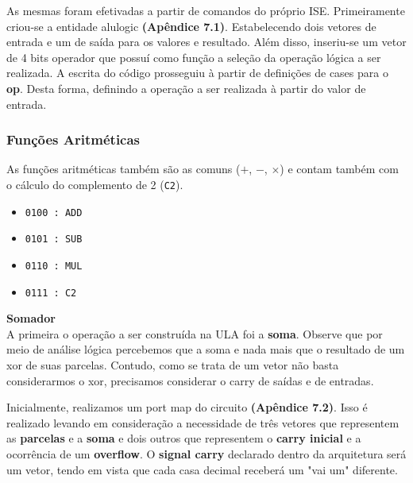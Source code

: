         As mesmas foram efetivadas a partir de comandos do próprio ISE. Primeiramente criou-se a entidade alulogic \textbf{(Apêndice 7.1)}. Estabelecendo dois vetores de entrada e um de saída para os valores e resultado. Além disso, inseriu-se um vetor de 4 bits operador que possuí como função a seleção da operação lógica a ser realizada.
        A escrita do código prosseguiu à partir de definições de cases para o \textbf{op}. Desta forma, definindo a operação a ser realizada à partir do valor de entrada. 
        
        \subsubsection*{Funções Aritméticas}
        As funções aritméticas também são as comuns ($+$, $-$, $\times$) e contam também com o cálculo do complemento de 2 (\texttt{C2}).
        \begin{itemize}
            \item [] \hspace{10pt} \texttt{0100 : ADD}
            \item [] \hspace{10pt} \texttt{0101 : SUB}
            \item [] \hspace{10pt} \texttt{0110 : MUL}
            \item [] \hspace{10pt} \texttt{0111 : C2}\footnotemark[\value{footnote}]
        \end{itemize}

        \textbf{Somador}\\
        
        A primeira o operação a ser construída na ULA foi a \textbf{soma}. Observe que por meio de análise lógica percebemos que a soma e nada mais que o resultado de um xor de suas parcelas. Contudo, como se trata de um vetor não basta considerarmos o xor, precisamos considerar o carry de saídas e de entradas.
        
        Inicialmente, realizamos um port map do circuito \textbf{(Apêndice 7.2)}. Isso é realizado levando em consideração a necessidade de três vetores que representem as \textbf{parcelas} e a \textbf{soma} e dois outros que representem o \textbf{carry inicial} e a ocorrência de um \textbf{overflow}. O \textbf{signal carry} declarado dentro da arquitetura será um vetor, tendo em vista que cada casa decimal receberá um "vai um" diferente.\\
        
